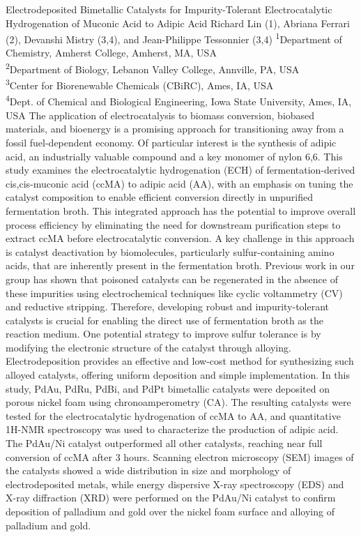 \makeabstract
{
Electrodeposited Bimetallic Catalysts for Impurity-Tolerant Electrocatalytic Hydrogenation of Muconic Acid to Adipic Acid
}
{
Richard Lin (1), Abriana Ferrari (2), Devanshi Mistry (3,4), and Jean-Philippe Tessonnier (3,4)
}
{
\textsuperscript{1}Department of Chemistry, Amherst College, Amherst, MA, USA\\
\textsuperscript{2}Department of Biology, Lebanon Valley College, Annville, PA, USA\\
\textsuperscript{3}Center for Biorenewable Chemicals (CBiRC), Ames, IA, USA\\
\textsuperscript{4}Dept. of Chemical and Biological Engineering, Iowa State University, Ames, IA, USA
}
{
The application of electrocatalysis to biomass conversion, biobased materials, and bioenergy is a promising approach for transitioning away from a fossil fuel-dependent economy. Of particular interest is the synthesis of adipic acid, an industrially valuable compound and a key monomer of nylon 6,6. This study examines the electrocatalytic hydrogenation (ECH) of fermentation-derived cis,cis-muconic acid (ccMA) to adipic acid (AA), with an emphasis on tuning the catalyst composition to enable efficient conversion directly in unpurified fermentation broth. This integrated approach has the potential to improve overall process efficiency by eliminating the need for downstream purification steps to extract ccMA before electrocatalytic conversion. A key challenge in this approach is catalyst deactivation by biomolecules, particularly sulfur-containing amino acids, that are inherently present in the fermentation broth. Previous work in our group has shown that poisoned catalysts can be regenerated in the absence of these impurities using electrochemical techniques like cyclic voltammetry (CV) and reductive stripping. Therefore, developing robust and impurity-tolerant catalysts is crucial for enabling the direct use of fermentation broth as the reaction medium.
}
{
One potential strategy to improve sulfur tolerance is by modifying the electronic structure of the catalyst through alloying. Electrodeposition provides an effective and low-cost method for synthesizing such alloyed catalysts, offering uniform deposition and simple implementation. In this study, PdAu, PdRu, PdBi, and PdPt bimetallic catalysts were deposited on porous nickel foam using chronoamperometry (CA). The resulting catalysts were tested for the electrocatalytic hydrogenation of ccMA to AA, and quantitative 1H-NMR spectroscopy was used to characterize the production of adipic acid.
}
{
The PdAu/Ni catalyst outperformed all other catalysts, reaching near full conversion of ccMA after 3 hours. Scanning electron microscopy (SEM) images of the catalysts showed a wide distribution in size and morphology of electrodeposited metals, while energy dispersive X-ray spectroscopy (EDS) and X-ray diffraction (XRD) were performed on the PdAu/Ni catalyst to confirm deposition of palladium and gold over the nickel foam surface and alloying of palladium and gold.
}
